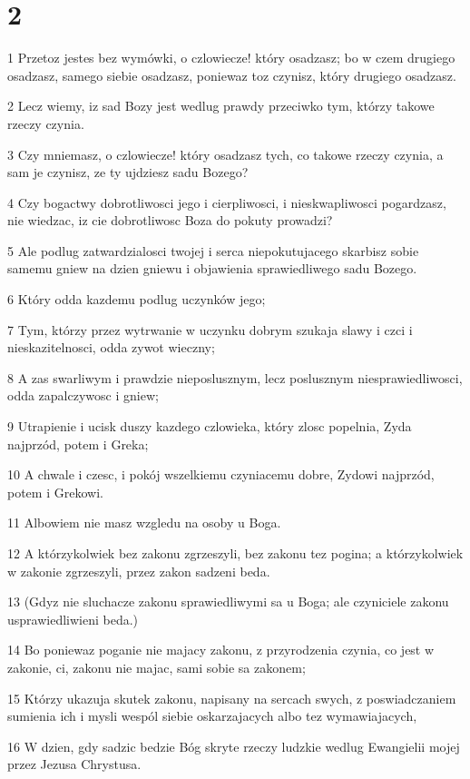 \chapter{2}

\par 1 Przetoz jestes bez wymówki, o czlowiecze! który osadzasz; bo w czem drugiego osadzasz, samego siebie osadzasz, poniewaz toz czynisz, który drugiego osadzasz.
\par 2 Lecz wiemy, iz sad Bozy jest wedlug prawdy przeciwko tym, którzy takowe rzeczy czynia.
\par 3 Czy mniemasz, o czlowiecze! który osadzasz tych, co takowe rzeczy czynia, a sam je czynisz, ze ty ujdziesz sadu Bozego?
\par 4 Czy bogactwy dobrotliwosci jego i cierpliwosci, i nieskwapliwosci pogardzasz, nie wiedzac, iz cie dobrotliwosc Boza do pokuty prowadzi?
\par 5 Ale podlug zatwardzialosci twojej i serca niepokutujacego skarbisz sobie samemu gniew na dzien gniewu i objawienia sprawiedliwego sadu Bozego.
\par 6 Który odda kazdemu podlug uczynków jego;
\par 7 Tym, którzy przez wytrwanie w uczynku dobrym szukaja slawy i czci i nieskazitelnosci, odda zywot wieczny;
\par 8 A zas swarliwym i prawdzie nieposlusznym, lecz poslusznym niesprawiedliwosci, odda zapalczywosc i gniew;
\par 9 Utrapienie i ucisk duszy kazdego czlowieka, który zlosc popelnia, Zyda najprzód, potem i Greka;
\par 10 A chwale i czesc, i pokój wszelkiemu czyniacemu dobre, Zydowi najprzód, potem i Grekowi.
\par 11 Albowiem nie masz wzgledu na osoby u Boga.
\par 12 A którzykolwiek bez zakonu zgrzeszyli, bez zakonu tez pogina; a którzykolwiek w zakonie zgrzeszyli, przez zakon sadzeni beda.
\par 13 (Gdyz nie sluchacze zakonu sprawiedliwymi sa u Boga; ale czyniciele zakonu usprawiedliwieni beda.)
\par 14 Bo poniewaz poganie nie majacy zakonu, z przyrodzenia czynia, co jest w zakonie, ci, zakonu nie majac, sami sobie sa zakonem;
\par 15 Którzy ukazuja skutek zakonu, napisany na sercach swych, z poswiadczaniem sumienia ich i mysli wespól siebie oskarzajacych albo tez wymawiajacych,
\par 16 W dzien, gdy sadzic bedzie Bóg skryte rzeczy ludzkie wedlug Ewangielii mojej przez Jezusa Chrystusa.
